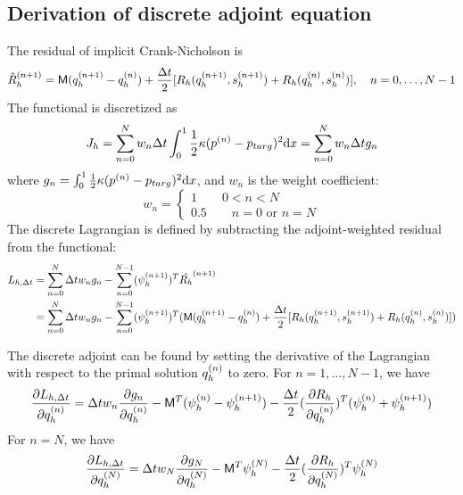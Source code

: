 \documentclass[a4paper]{article}
\begin{document}
\subsection{Derivation of discrete adjoint equation}
The residual of implicit Crank-Nicholson is 
\begin{equation}
\begin{aligned}
\hat{R}_h^{(n+1)} =\mathsf{M} (q_h^{(n+1)} - q_h^{(n)}) + \frac{\Delta t}{2}[R_h(q_h^{(n+1)},s_h^{(n+1)}) + R_h(q_h^{(n)}, s_h^{(n)})], \quad n=0,\dots,N-1
\end{aligned}
\end{equation}
The functional is discretized as
\begin{equation}
\begin{aligned}
J_h = \sum_{n=0}^{N} w_n \Delta t\int_{0}^{1} \frac{1}{2}\kappa(p^{(n)} - p_{targ})^2\mathrm{d} x = \sum_{n=0}^{N} w_n \Delta t g_n
\end{aligned}
\end{equation}
where $g_n = \int_{0}^{1}\frac{1}{2}\kappa(p^{(n)} - p_{targ})^2\mathrm{d} x$, and $w_n$ is the weight coefficient:
\begin{equation}
w_n = \begin{cases}
1\qquad 0 < n< N\\
0.5 \qquad n=0\text{ or } n=N
\end{cases}
\end{equation}
The discrete Lagrangian is defined by subtracting the adjoint-weighted residual from the functional:
\begin{equation}\label{eq:lagr}
\begin{aligned}
L_{h,\Delta t} &= \sum_{n=0}^{N}\Delta t w_n g_n - \sum_{n=0}^{N-1}(\psi_h^{(n+1)})^T \hat{R_h}^{(n+1)} \\
&=\sum_{n=0}^{N}\Delta t w_n g_n - \sum_{n=0}^{N-1}(\psi_h^{(n+1)})^T (\mathsf{M} (q_h^{(n+1)} - q_h^{(n)}) + \frac{\Delta t}{2}[R_h(q_h^{(n+1)},s_h^{(n+1)}) + R_h(q_h^{(n)}, s_h^{(n)})])
\end{aligned}
\end{equation} 

The discrete adjoint can be found by setting the derivative of the Lagrangian with respect to the primal solution $q_h^{(n)}$ to zero. For $n=1,\dots,N-1$, we have
\begin{equation}\label{eq:deriv1}
\begin{aligned}
\frac{\partial {L_{h,\Delta t}}}{\partial{q_h^{(n)}}} &= \Delta t w_n \frac{\partial {g_n}}{\partial{q_h^{(n)}}} - \mathsf{M}^T(\psi_h^{(n)} -  \psi_h^{(n+1)}) - \frac{\Delta t}{2}(\frac{\partial {R_h}}{\partial{q_h^{(n)}}})^T(\psi_h^{(n)}+\psi_h^{(n+1)}) \\
\end{aligned}
\end{equation}
For $n=N$, we have
\begin{equation}\label{eq:deriv2}
\begin{aligned}
\frac{\partial {L_{h,\Delta t}}}{\partial{q^{(N)}_h}} 
&= \Delta t w_N \frac{\partial {g_N}}{\partial{q^{(N)}_h}} - \mathsf{M}^T\psi^{(N)}_h - \frac{\Delta t}{2}(\frac{\partial {R_h}}{\partial{q^{(N)}_h}})^T\psi^{(N)}_h \\
\end{aligned}
\end{equation}
\end{document}
